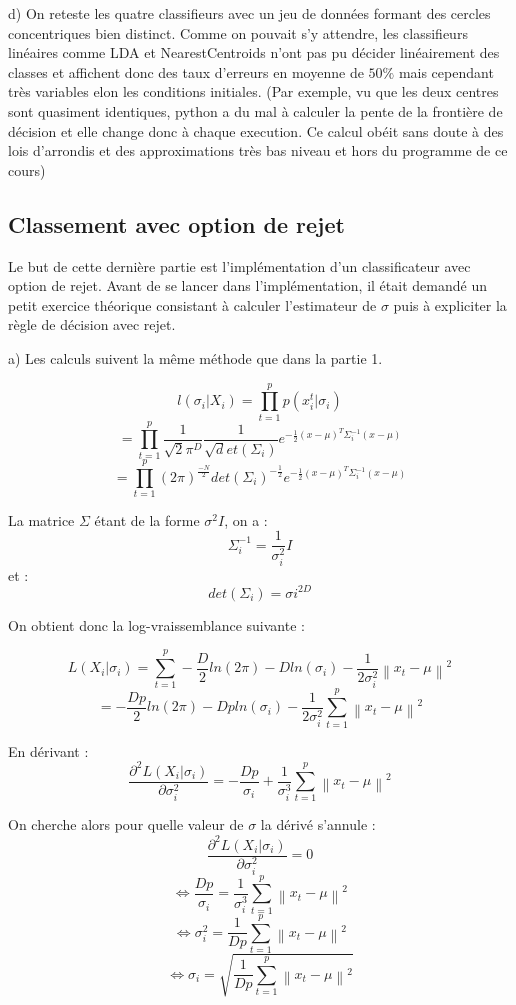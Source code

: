 \documentclass{article}
\begin{document}
d) On reteste les quatre classifieurs avec un jeu de données formant des cercles concentriques bien distinct. Comme on pouvait s'y attendre, les classifieurs linéaires comme LDA et NearestCentroids n'ont pas pu décider linéairement des classes et affichent donc des taux d'erreurs en moyenne de $50\%$ mais cependant très variables elon les conditions initiales. (Par exemple, vu que les deux centres sont quasiment identiques, python a du mal à calculer la pente de la frontière de décision et elle change donc à chaque execution. Ce calcul obéit sans doute à des lois d'arrondis et des approximations très bas niveau et hors du programme de ce cours)


\newpage
\subsection{Classement avec option de rejet}

Le but de cette dernière partie est l'implémentation d'un classificateur avec option de rejet. Avant de se lancer dans l'implémentation, il était demandé un petit exercice théorique consistant à calculer l'estimateur de $\sigma$ puis à expliciter la règle de décision avec rejet.

a) Les calculs suivent la même méthode que dans la partie 1.

$$
l(\sigma_{i}|X_{i}) = \prod_{t = 1}^{p} p(x_{i}^{t} |\sigma_{i}) 
$$
$$
= \prod_{t = 1}^{p} \frac{1}{\sqrt 2 \pi^{D}} \frac{1}{\sqrt det( \Sigma_{i} )}
e^{- \frac{1}{2} (x-\mu)^{T}\Sigma_{i}^{-1}(x-\mu)} 
$$
$$
= \prod_{t = 1}^{p} (2\pi)^{\frac{-N}{2}} det( \Sigma_{i} )^{- \frac{1}{2}} e^{- \frac{1}{2} (x-\mu)^{T}\Sigma_{i}^{-1}(x-\mu)} 
$$

La matrice $\Sigma$ étant de la forme $\sigma^{2} I$, on a :
$$
\Sigma_{i}^{-1} = \frac{1}{\sigma_{i}^{2}}I
$$
et :
$$
det(\Sigma_{i}) = \sigma{i}^{2D}  
$$

On obtient donc la log-vraissemblance suivante :

$$
L(X_{i}|\sigma_{i}) = \sum_{t=1}^{p} - \frac{D}{2}ln(2\pi) - Dln(\sigma_{i})-\frac{1}{2\sigma_{i}^{2}}\left \| x_{t} - \mu \right \|^{2} 
$$
$$
= -\frac{Dp}{2}ln(2\pi) - Dpln(\sigma_{i}) - \frac{1}{2\sigma_{i}^{2}}\sum_{t=1}^{p}\left \| x_{t} - \mu \right \|^{2}
$$

En dérivant : 
$$
\frac{\partial^2 L(X_{i}|\sigma_{i})}{\partial \sigma_{i}^2} = -\frac{Dp}{\sigma_{i}} + \frac{1}{\sigma_{i}^3}\sum_{t=1}^{p}\left \| x_{t} - \mu \right \|^{2}
$$

On cherche alors pour quelle valeur de $\sigma$  la dérivé s'annule :
$$
\frac{\partial^2 L(X_{i}|\sigma_{i})}{\partial \sigma_{i}^2} = 0 
$$
$$
\Leftrightarrow  \frac{Dp}{\sigma_{i}} = \frac{1}{\sigma_{i}^3}\sum_{t=1}^{p}\left \| x_{t} - \mu \right \|^{2} 
$$
$$
\Leftrightarrow \sigma_{i}^2 = \frac{1}{Dp}\sum_{t=1}^{p}\left \| x_{t} - \mu \right \|^{2} 
$$
$$
\Leftrightarrow \sigma_{i} = \sqrt{\frac{1}{Dp}\sum_{t=1}^{p}\left \| x_{t} - \mu \right \|^{2}}
$$
\end{document}

